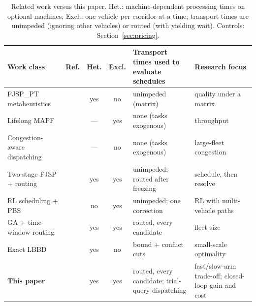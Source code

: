 \begin{table}[t]
  \caption{Related work versus this paper. Het.: machine-dependent processing times on optional machines; Excl.: one vehicle per corridor at a time; transport times are unimpeded (ignoring other vehicles) or routed (with yielding wait). Controls: Section~\ref{sec:pricing}.}
\label{tab:related}
\footnotesize
\renewcommand{\arraystretch}{1.2}
\begin{tabular}{@{}p{2.5cm}cccp{2.9cm}p{3.1cm}@{}}
\toprule
Work class & Ref. & Het. & Excl. & Transport times used to evaluate schedules & Research focus \\
\midrule
FJSP\_PT metaheuristics & \cite{meng2025cp,qin2026knowledge,fu2025integrated} & yes & no & unimpeded (matrix) & quality under a matrix \\
Lifelong MAPF & \cite{gao2023mapf,zhang2024guidance} & --- & yes & none (tasks exogenous) & throughput \\
Congestion-aware dispatching & \cite{kim2026congestion} & --- & no & none (tasks exogenous) & large-fleet congestion \\
Two-stage FJSP + routing & \cite{sun2023integrated} & yes & yes & unimpeded; routed after freezing & schedule, then resolve \\
RL scheduling + PBS & \cite{li2026framework} & no & yes & unimpeded; one correction & RL with multi-vehicle paths \\
GA + time-window routing & \cite{lyu2019approach} & yes & yes & routed, every candidate & fleet size \\
Exact LBBD & \cite{vanos2026exact} & yes & no & bound + conflict cuts & small-scale optimality \\
\textbf{This paper} & & yes & yes & routed, every candidate; trial-query dispatching & fast/slow-arm trade-off; closed-loop gain and cost \\
\bottomrule
\end{tabular}
\end{table}
